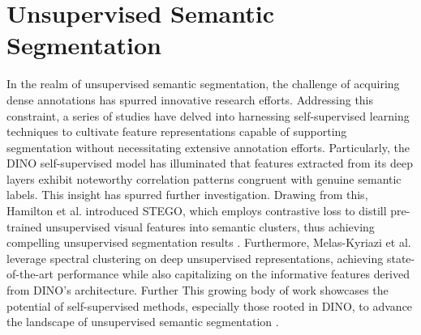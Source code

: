 \section{Unsupervised Semantic Segmentation}
In the realm of unsupervised semantic segmentation, the challenge of acquiring dense annotations has spurred innovative research efforts. Addressing this constraint, a series of studies \cite{hwang2019segsort,melas2022deep,cho2021picie,wang2022tokencut,hamilton2022unsupervised} have delved into harnessing self-supervised learning techniques to cultivate feature representations capable of supporting segmentation without necessitating extensive annotation efforts. Particularly, the DINO self-supervised model has illuminated that features extracted from its deep layers exhibit noteworthy correlation patterns congruent with genuine semantic labels. This insight has spurred further investigation. Drawing from this, Hamilton et al. introduced STEGO, which employs contrastive loss to distill pre-trained unsupervised visual features into semantic clusters, thus achieving compelling unsupervised segmentation results \cite{hamilton2022unsupervised}. Furthermore, Melas-Kyriazi et al. leverage spectral clustering on deep unsupervised representations, achieving state-of-the-art performance while also capitalizing on the informative features derived from DINO's architecture. Further This growing body of work showcases the potential of self-supervised methods, especially those rooted in DINO, to advance the landscape of unsupervised semantic segmentation \cite{melas2022deep}.



